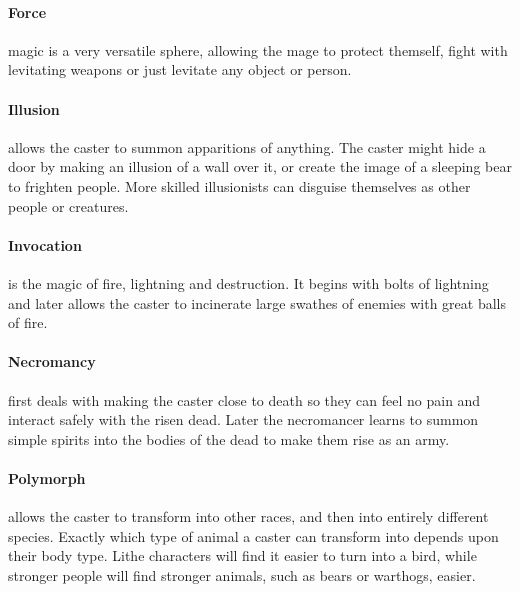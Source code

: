 {\begin{multicols}{2}
\paragraph{Force} magic is a very versatile sphere, allowing the mage to protect themself, fight with levitating weapons or just levitate any object or person.

\paragraph{Illusion} allows the caster to summon apparitions of anything. The caster might hide a door by making an illusion of a wall over it, or create the image of a sleeping bear to frighten people. More skilled illusionists can disguise themselves as other people or creatures.

\paragraph{Invocation} is the magic of fire, lightning and destruction. It begins with bolts of lightning and later allows the caster to incinerate large swathes of enemies with great balls of fire.

\paragraph{Necromancy} first deals with making the caster close to death so they can feel no pain and interact safely with the risen dead.
Later the necromancer learns to summon simple spirits into the bodies of the dead to make them rise as an army.

\paragraph{Polymorph} allows the caster to transform into other races, and then into entirely different species.
Exactly which type of animal a caster can transform into depends upon their body type.
Lithe characters will find it easier to turn into a bird, while stronger people will find stronger animals, such as bears or warthogs, easier.

\end{multicols}

}{}


